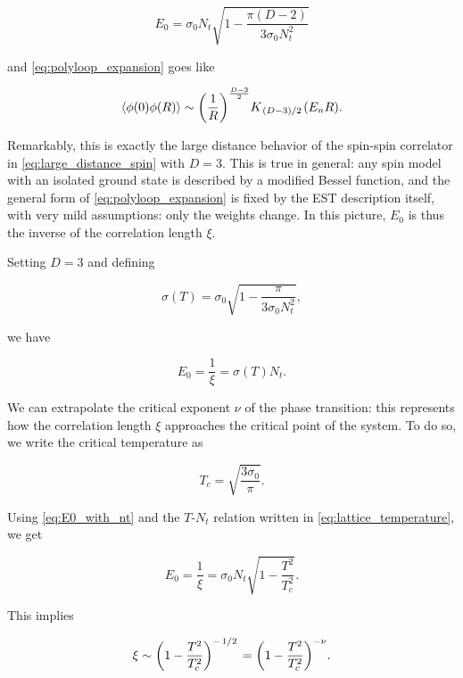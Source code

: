 \documentclass[reqno,12pt]{article}
\numberwithin{equation}{section}
\begin{document}
\begin{equation}
	E_0 = \sigma_0 N_t \sqrt{1 - \frac{\pi(D - 2)}{3\sigma_0 N_t^2}}
\end{equation}

and \eqref{eq:polyloop_expansion} goes like

\begin{equation}
	\expval{\phi(0) \phi(R)} \sim \qty(\frac{1}{R})^{\frac{D-3}{2}} K_{\flatfrac{(D-3)}{2}}(E_n R).
\end{equation}

Remarkably, this is exactly the large distance behavior of the spin-spin correlator in \eqref{eq:large_distance_spin}
with $D = 3$.
This is true in general: any spin model with an isolated ground state is described
by a modified Bessel function, and the general form of \eqref{eq:polyloop_expansion} is fixed by the EST description itself,
with very mild assumptions: only the weights change.
In this picture, $E_0$ is thus the inverse of the correlation length $\xi$. 

Setting $D = 3$ and defining 

\begin{equation}
	\sigma(T) = \sigma_0 \sqrt{1 - \frac{\pi}{3 \sigma_0 N_t^2}}, 
\end{equation}

we have

\begin{equation} \label{eq:E0_with_nt}
	E_0 = \frac{1}{\xi} = \sigma(T) N_t.
\end{equation}

We can extrapolate the critical exponent $\nu$ of the phase transition: this represents how the correlation length
$\xi$ approaches the critical point of the system. To do so, we write the critical temperature as

\begin{equation}
	T_c = \sqrt{\frac{3\sigma_0}{\pi}}.
\end{equation}

Using \eqref{eq:E0_with_nt} and the $T$-$N_t$ relation written in \eqref{eq:lattice_temperature}, we get

\begin{equation}
	E_0 = \frac{1}{\xi} = \sigma_0 N_t \sqrt{1 - \frac{T^2}{T_c^2}}.
\end{equation}

This implies

\begin{equation}
	\xi \sim \qty(1 - \frac{T^2}{T^2_c})^{-\flatfrac{1}{2}} = \qty(1 - \frac{T^2}{T^2_c})^{-\nu}.
\end{equation}
\end{document}

